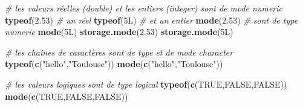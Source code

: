 \documentclass[
]{book}
\newenvironment{Shaded}{\begin{snugshade}}{\end{snugshade}}
\newcommand{\CommentTok}[1]{\textcolor[rgb]{0.56,0.35,0.01}{\textit{#1}}}
\newcommand{\ConstantTok}[1]{\textcolor[rgb]{0.56,0.35,0.01}{#1}}
\newcommand{\DataTypeTok}[1]{\textcolor[rgb]{0.13,0.29,0.53}{#1}}
\newcommand{\DecValTok}[1]{\textcolor[rgb]{0.00,0.00,0.81}{#1}}
\newcommand{\FloatTok}[1]{\textcolor[rgb]{0.00,0.00,0.81}{#1}}
\newcommand{\FunctionTok}[1]{\textcolor[rgb]{0.13,0.29,0.53}{\textbf{#1}}}
\newcommand{\NormalTok}[1]{#1}
\newcommand{\StringTok}[1]{\textcolor[rgb]{0.31,0.60,0.02}{#1}}
\begin{document}
\begin{Shaded}
\begin{Highlighting}[]
\CommentTok{\# les valeurs réelles (\textquotesingle{}double\textquotesingle{}) et les entiers (\textquotesingle{}integer\textquotesingle{}) sont de mode \textquotesingle{}numeric\textquotesingle{}}
\FunctionTok{typeof}\NormalTok{(}\FloatTok{2.53}\NormalTok{) }\CommentTok{\# un réel}
\FunctionTok{typeof}\NormalTok{(}\DecValTok{5}\DataTypeTok{L}\NormalTok{) }\CommentTok{\# et un entier}
\FunctionTok{mode}\NormalTok{(}\FloatTok{2.53}\NormalTok{) }\CommentTok{\# sont de type \textquotesingle{}numeric\textquotesingle{}}
\FunctionTok{mode}\NormalTok{(}\DecValTok{5}\DataTypeTok{L}\NormalTok{)}
\FunctionTok{storage.mode}\NormalTok{(}\FloatTok{2.53}\NormalTok{)}
\FunctionTok{storage.mode}\NormalTok{(}\DecValTok{5}\DataTypeTok{L}\NormalTok{)}

\CommentTok{\# les chaînes de caractères sont de type et de mode \textquotesingle{}character\textquotesingle{}}
\FunctionTok{typeof}\NormalTok{(}\FunctionTok{c}\NormalTok{(}\StringTok{"hello"}\NormalTok{,}\StringTok{"Toulouse"}\NormalTok{))}
\FunctionTok{mode}\NormalTok{(}\FunctionTok{c}\NormalTok{(}\StringTok{"hello"}\NormalTok{,}\StringTok{"Toulouse"}\NormalTok{))}

\CommentTok{\# les valeurs logiques sont de type \textquotesingle{}logical\textquotesingle{}}
\FunctionTok{typeof}\NormalTok{(}\FunctionTok{c}\NormalTok{(}\ConstantTok{TRUE}\NormalTok{,}\ConstantTok{FALSE}\NormalTok{,}\ConstantTok{FALSE}\NormalTok{))}
\FunctionTok{mode}\NormalTok{(}\FunctionTok{c}\NormalTok{(}\ConstantTok{TRUE}\NormalTok{,}\ConstantTok{FALSE}\NormalTok{,}\ConstantTok{FALSE}\NormalTok{))}
\end{Highlighting}
\end{Shaded}
\end{document}
